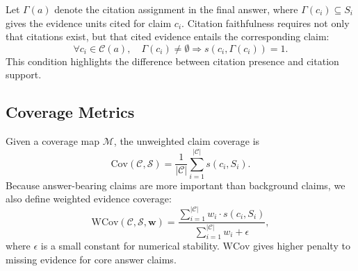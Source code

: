 Let $\Gamma(a)$ denote the citation assignment in the final answer, where $\Gamma(c_i) \subseteq S_i$ gives the evidence units cited for claim $c_i$. Citation faithfulness requires not only that citations exist, but that cited evidence entails the corresponding claim:
\begin{equation}
    \forall c_i \in \mathcal{C}(a), \quad
    \Gamma(c_i) \neq \emptyset
    \Rightarrow
    s(c_i, \Gamma(c_i)) = 1.
    \label{eq:citation_faithfulness_condition}
\end{equation}
This condition highlights the difference between citation presence and citation support.

\subsection{Coverage Metrics}
\label{subsec:coverage_metrics}

Given a coverage map $\mathcal{M}$, the unweighted claim coverage is
\begin{equation}
    \mathrm{Cov}(\mathcal{C}, \mathcal{S})
    =
    \frac{1}{|\mathcal{C}|}
    \sum_{i=1}^{|\mathcal{C}|}
    s(c_i, S_i).
    \label{eq:claim_coverage}
\end{equation}
Because answer-bearing claims are more important than background claims, we also define weighted evidence coverage:
\begin{equation}
    \mathrm{WCov}(\mathcal{C}, \mathcal{S}, \mathbf{w})
    =
    \frac{
        \sum_{i=1}^{|\mathcal{C}|} w_i \cdot s(c_i, S_i)
    }{
        \sum_{i=1}^{|\mathcal{C}|} w_i + \epsilon
    },
    \label{eq:weighted_coverage}
\end{equation}
where $\epsilon$ is a small constant for numerical stability. $\mathrm{WCov}$ gives higher penalty to missing evidence for core answer claims.

